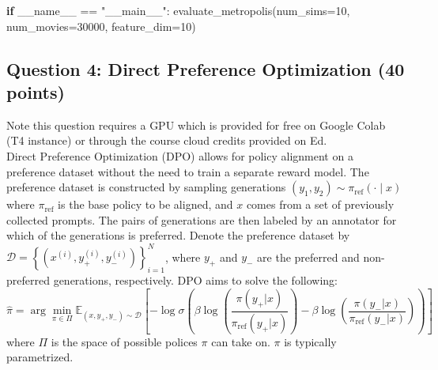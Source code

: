 \documentclass[
  letterpaper,
  numbers=noenddot,
  DIV=11]{scrreprt}
\newenvironment{Shaded}{\begin{snugshade}}{\end{snugshade}}
\newcommand{\ControlFlowTok}[1]{\textcolor[rgb]{0.00,0.23,0.31}{\textbf{#1}}}
\newcommand{\DecValTok}[1]{\textcolor[rgb]{0.68,0.00,0.00}{#1}}
\newcommand{\NormalTok}[1]{\textcolor[rgb]{0.00,0.23,0.31}{#1}}
\newcommand{\OperatorTok}[1]{\textcolor[rgb]{0.37,0.37,0.37}{#1}}
\newcommand{\StringTok}[1]{\textcolor[rgb]{0.13,0.47,0.30}{#1}}
\newcommand{\VariableTok}[1]{\textcolor[rgb]{0.07,0.07,0.07}{#1}}
\theoremstyle{definition}
\theoremstyle{plain}
\theoremstyle{plain}
\theoremstyle{remark}
\begin{document}
\begin{tcolorbox}[colframe=.grey, title=\faCode \enspace Code]
\begin{Shaded}
\begin{Highlighting}[numbers=left,,]
\ControlFlowTok{if} \VariableTok{\_\_name\_\_} \OperatorTok{==} \StringTok{"\_\_main\_\_"}\NormalTok{:}
\NormalTok{    evaluate\_metropolis(num\_sims}\OperatorTok{=}\DecValTok{10}\NormalTok{, num\_movies}\OperatorTok{=}\DecValTok{30000}\NormalTok{, feature\_dim}\OperatorTok{=}\DecValTok{10}\NormalTok{)}
\end{Highlighting}
\end{Shaded}

\end{tcolorbox}

\subsection*{Question 4: Direct Preference Optimization (40
points)}\label{question-4-direct-preference-optimization-40-points}

Note this question requires a GPU which is provided for free on Google
Colab (T4 instance) or through the course cloud credits provided on
Ed.\\
Direct Preference Optimization (DPO) allows for policy alignment on a
preference dataset without the need to train a separate reward model.
The preference dataset is constructed by sampling generations
\((y_1, y_2)\sim \pi_{\text{ref}}(\cdot\mid x)\) where
\(\pi_\text{ref}\) is the base policy to be aligned, and \(x\) comes
from a set of previously collected prompts. The pairs of generations are
then labeled by an annotator for which of the generations is preferred.
Denote the preference dataset by
\(\mathcal{D}=\left\{\left(x^{(i)}, y_+^{(i)}, y_-^{(i)}\right)\right\}_{i=1}^N\),
where \(y_+\) and \(y_-\) are the preferred and non-preferred
generations, respectively. DPO aims to solve the following:
\[\hat{\pi}=\arg \min_{\pi\in\Pi}\mathbb{E}_{(x, y_+, y_-)\sim\mathcal{D}}\left[-\log\sigma\left(
\beta\log\left(\frac{\pi(y_+ | x)}{\pi_{\text{ref}}(y_+ | x)}\right)-\beta\log\left(\frac{\pi(y_- | x)}{\pi_{\text{ref}}(y_- | x)}\right)\right)\right]\]
where \(\Pi\) is the space of possible polices \(\pi\) can take on.
\(\pi\) is typically parametrized.
\end{document}
